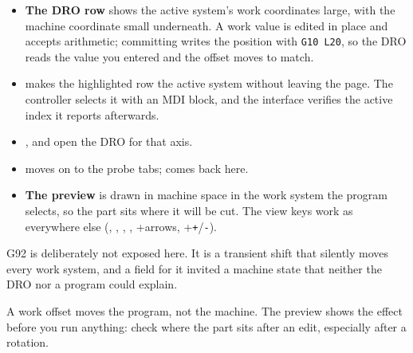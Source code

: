 \begin{itemize}
  \item \textbf{The DRO row} shows the active system's work coordinates large, with the machine
        coordinate small underneath. A work value is edited in place and accepts arithmetic;
        committing writes the position with \texttt{G10 L20}, so the DRO reads the value you
        entered and the offset moves to match.
  \item \textbf{} makes the highlighted row the active system without leaving the
        page. The controller selects it with an MDI block, and the interface verifies the
        active index it reports afterwards.
  \item \textbf{},  and  open the DRO for that axis.
  \item \textbf{} moves on to the probe tabs;  comes back here.
  \item \textbf{The preview} is drawn in machine space in the work system the program selects,
        so the part sits where it will be cut. The view keys work as everywhere else
        (, , ,
        , +arrows, \mbox{+\texttt{+}/\texttt{-}}).
\end{itemize}

G92 is deliberately not exposed here. It is a transient shift that silently moves every work
system, and a field for it invited a machine state that neither the DRO nor a program could
explain.

\begin{cautionbox}
  A work offset moves the program, not the machine. The preview shows the effect before you run
  anything: check where the part sits after an edit, especially after a rotation.
\end{cautionbox}
